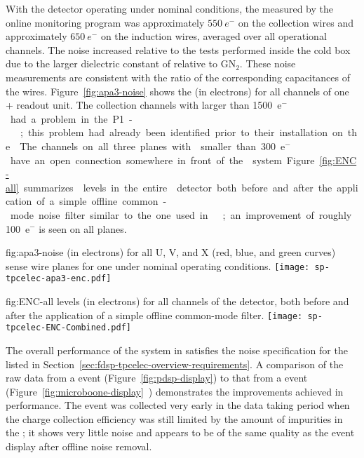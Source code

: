 With the detector operating under nominal
conditions, the 
measured  by the online monitoring program was approximately $\SI{550}{e^-}$ 
on the collection wires and approximately $\SI{650}{e^-}$ on the induction
wires, averaged over all operational channels. The noise increased
relative to the tests performed inside the cold box due to the 
larger dielectric constant of  relative to GN$_2$. 
These noise measurements 
are consistent with the 
ratio of the corresponding capacitances of the  wires. 
Figure~\ref{fig:apa3-noise} 
shows the  (in electrons) for all channels of one 
+ readout unit. 
The collection channels with  larger than \SI{1500}{e$^-$} had a problem 
in the P1- ; this problem had already been identified 
prior to their
installation on the . The channels on all three planes 
with  smaller than \SI{300}{e$^-$} have an open connection somewhere in 
front of the  system. Figure~\ref{fig:ENC-all} summarizes
 levels in the entire  detector both before and
after the application of a simple offline common-mode noise filter similar
to the one used in ~\cite{Acciarri:2017sde};
an improvement of roughly 100~e$^-$ is seen on all planes. 

\begin{dunefigure}
{fig:apa3-noise}
{ (in electrons) for all U, V, and X (red, blue, and green curves) sense 
wire planes for one   %
under nominal operating 
conditions.}
\texttt{[image: sp-tpcelec-apa3-enc.pdf]}
\end{dunefigure}

\begin{dunefigure}
{fig:ENC-all}
{ levels (in electrons) for all channels of the  detector, both
before and after the application of a simple offline common-mode filter.}
\texttt{[image: sp-tpcelec-ENC-Combined.pdf]}
\end{dunefigure}

The overall performance of the  system in 
 satisfies the 
 noise specification %
for the  %
listed in Section~\ref{sec:fdsp-tpcelec-overview-requirements}. 
A comparison of the raw data from 
a  event (Figure~\ref{fig:pdsp-display}) to 
that from a  event (Figure~\ref{fig:microboone-display}~\cite{Acciarri:2017sde}) 
demonstrates the improvements achieved in  performance. 
The  event was collected very early in the data taking
period when the charge collection efficiency was still limited
by the amount of impurities in the ; it shows very little
noise and appears to be of the same quality as the 
event display after offline noise removal. 

